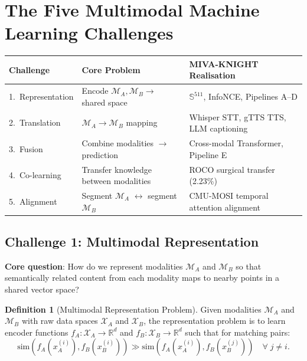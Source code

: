 \documentclass[12pt,a4paper]{article}
\theoremstyle{definition}
\newtheorem{definition}{Definition}[section]
\theoremstyle{plain}
\theoremstyle{remark}
\newcommand{\R}{\mathbb{R}}
\newcommand{\Sph}{\mathbb{S}}
\newcommand{\MA}{\mathcal{M}_A}
\newcommand{\MB}{\mathcal{M}_B}
\begin{document}
\newpage
\section{The Five Multimodal Machine Learning Challenges}
\label{sec:fivechallenges}

\begin{tcolorbox}[keybox,title={Five Canonical MML Challenges in MIVA-KNIGHT}]
\begin{tabular}{lll}
\toprule
\textbf{Challenge} & \textbf{Core Problem} & \textbf{MIVA-KNIGHT Realisation} \\
\midrule
1.~Representation & Encode $\MA, \MB \to$ shared space & $\Sph^{511}$, InfoNCE, Pipelines A--D \\
2.~Translation & $\MA \to \MB$ mapping & Whisper STT, gTTS TTS, LLM captioning \\
3.~Fusion & Combine modalities $\to$ prediction & Cross-modal Transformer, Pipeline E \\
4.~Co-learning & Transfer knowledge between modalities & ROCO surgical transfer (2.23\%) \\
5.~Alignment & Segment $\MA$ $\leftrightarrow$ segment $\MB$ & CMU-MOSI temporal attention alignment \\
\bottomrule
\end{tabular}
\end{tcolorbox}

\subsection{Challenge 1: Multimodal Representation}

\begin{tcolorbox}[challengebox,title={Challenge 1: Representation}]
\textbf{Core question}: How do we represent modalities $\MA$ and $\MB$ so that semantically related content from each modality maps to nearby points in a shared vector space?
\end{tcolorbox}

\begin{definition}[Multimodal Representation Problem]
Given modalities $\MA$ and $\MB$ with raw data spaces $\mathcal{X}_A$ and $\mathcal{X}_B$, the representation problem is to learn encoder functions $f_A : \mathcal{X}_A \to \R^d$ and $f_B : \mathcal{X}_B \to \R^d$ such that for matching pairs:
\[
  \text{sim}(f_A(x_A^{(i)}), f_B(x_B^{(i)})) \gg \text{sim}(f_A(x_A^{(i)}), f_B(x_B^{(j)})) \quad \forall\; j \ne i.
\]
\end{definition}
\end{document}
